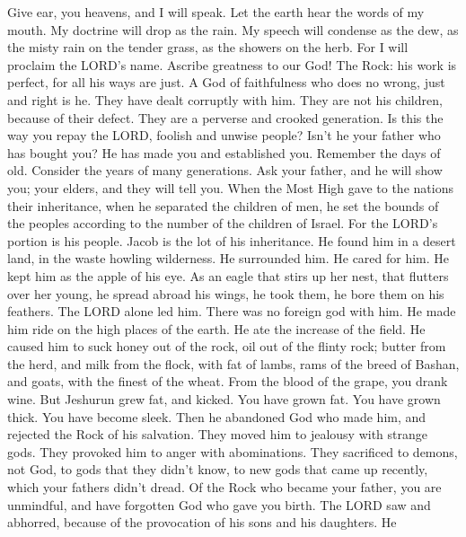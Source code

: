  Give ear, you heavens, and I will speak. Let the earth
hear the words of my mouth.  My doctrine will drop as the
rain. My speech will condense as the dew, as the misty rain on the
tender grass, as the showers on the herb.  For I will
proclaim the LORD's name. Ascribe greatness to our God! 
The Rock: his work is perfect, for all his ways are just. A God of
faithfulness who does no wrong, just and right is he. 
They have dealt corruptly with him. They are not his children, because
of their defect. They are a perverse and crooked generation.
 Is this the way you repay the LORD, foolish and unwise
people? Isn't he your father who has bought you? He has made you and
established you.  Remember the days of old. Consider the
years of many generations. Ask your father, and he will show you; your
elders, and they will tell you.  When the Most High gave
to the nations their inheritance, when he separated the children of men,
he set the bounds of the peoples according to the number of the children
of Israel.  For the LORD's portion is his people. Jacob is
the lot of his inheritance.  He found him in a desert
land, in the waste howling wilderness. He surrounded him. He cared for
him. He kept him as the apple of his eye.  As an eagle
that stirs up her nest, that flutters over her young, he spread abroad
his wings, he took them, he bore them on his feathers. 
The LORD alone led him. There was no foreign god with him.
 He made him ride on the high places of the earth. He ate
the increase of the field. He caused him to suck honey out of the rock,
oil out of the flinty rock;  butter from the herd, and
milk from the flock, with fat of lambs, rams of the breed of Bashan, and
goats, with the finest of the wheat. From the blood of the grape, you
drank wine.  But Jeshurun grew fat, and kicked. You have
grown fat. You have grown thick. You have become sleek. Then he
abandoned God who made him, and rejected the Rock of his salvation.
 They moved him to jealousy with strange gods. They
provoked him to anger with abominations.  They sacrificed
to demons, not God, to gods that they didn't know, to new gods that came
up recently, which your fathers didn't dread.  Of the
Rock who became your father, you are unmindful, and have forgotten God
who gave you birth.  The LORD saw and abhorred, because
of the provocation of his sons and his daughters.  He
